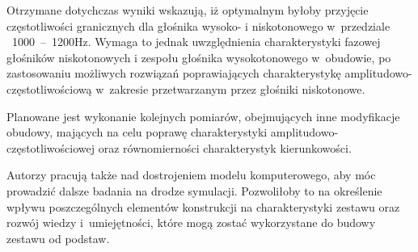 \documentclass[12pt]{oska}
\newcommand{\range}[2]{\num{#1}~--~\num{#2}}
\begin{document}
	Otrzymane dotychczas wyniki wskazują, iż optymalnym byłoby przyjęcie częstotliwości granicznych dla głośnika wysoko- i niskotonowego w~przedziale ~\range{1000}{1200}\si{Hz}. Wymaga to jednak uwzględnienia charakterystyki fazowej głośników niskotonowych i zespołu głośnika wysokotonowego w~obudowie, po zastosowaniu możliwych rozwiązań poprawiających charakterystykę amplitudowo-częstotliwościową w~zakresie przetwarzanym przez głośniki niskotonowe. 
	
	Planowane jest wykonanie kolejnych pomiarów, obejmujących inne modyfikacje obudowy, mających na celu poprawę charakterystyki amplitudowo-częstotliwościowej oraz równomierności charakterystyk kierunkowości. 
	
	Autorzy pracują także nad dostrojeniem modelu komputerowego, aby móc prowadzić dalsze badania na drodze symulacji. Pozwoliłoby to na określenie wpływu poszczególnych elementów konstrukcji na charakterystyki zestawu oraz rozwój wiedzy i~umiejętności, które mogą zostać wykorzystane do budowy zestawu od podstaw. 
	
	\printbibliography
	
\end{document}
